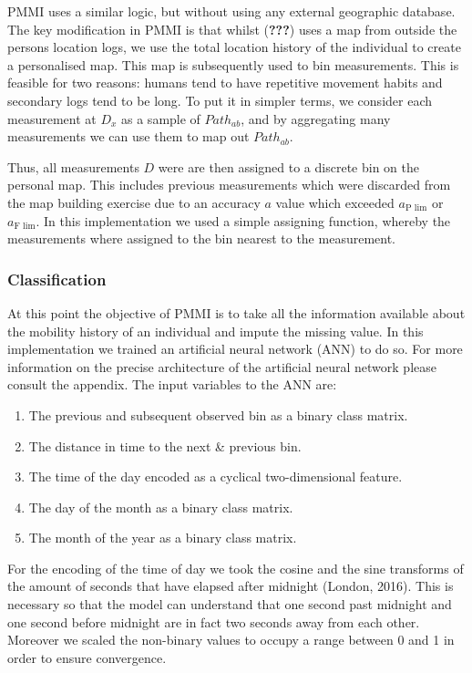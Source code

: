 \documentclass[man]{apa6}
\providecommand{\tightlist}{%
  \setlength{\itemsep}{0pt}\setlength{\parskip}{0pt}}
\theoremstyle{definition}
\theoremstyle{definition}
\theoremstyle{definition}
\theoremstyle{remark}
\begin{document}
PMMI uses a similar logic, but without using any external geographic
database. The key modification in PMMI is that whilst ({\textbf{???}})
uses a map from outside the persons location logs, we use the total
location history of the individual to create a personalised map. This
map is subsequently used to bin measurements. This is feasible for two
reasons: humans tend to have repetitive movement habits and secondary
logs tend to be long. To put it in simpler terms, we consider each
measurement at \(D_x\) as a sample of \(Path_{ab}\), and by aggregating
many measurements we can use them to map out \(Path_{ab}\).

Thus, all measurements \(D\) were are then assigned to a discrete bin on
the personal map. This includes previous measurements which were
discarded from the map building exercise due to an accuracy \(a\) value
which exceeded \(a_{\text{P lim}}\) or \(a_{\text{F lim}}\). In this
implementation we used a simple assigning function, whereby the
measurements where assigned to the bin nearest to the measurement.

\subsubsection{Classification}\label{classification}

At this point the objective of PMMI is to take all the information
available about the mobility history of an individual and impute the
missing value. In this implementation we trained an artificial neural
network (ANN) to do so. For more information on the precise architecture
of the artificial neural network please consult the appendix. The input
variables to the ANN are:

\begin{enumerate}
\def\labelenumi{\arabic{enumi}.}
\tightlist
\item
  The previous and subsequent observed bin as a binary class matrix.
\item
  The distance in time to the next \& previous bin.
\item
  The time of the day encoded as a cyclical two-dimensional feature.
\item
  The day of the month as a binary class matrix.
\item
  The month of the year as a binary class matrix.
\end{enumerate}

For the encoding of the time of day we took the cosine and the sine
transforms of the amount of seconds that have elapsed after midnight
(London, 2016). This is necessary so that the model can understand that
one second past midnight and one second before midnight are in fact two
seconds away from each other. Moreover we scaled the non-binary values
to occupy a range between 0 and 1 in order to ensure convergence.
\end{document}
